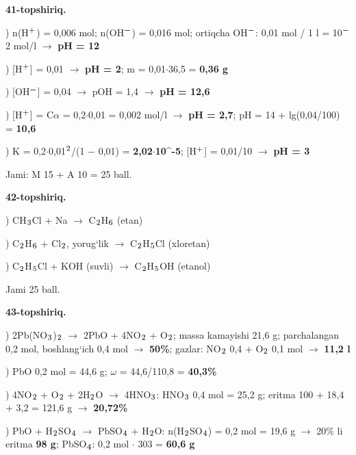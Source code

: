 \documentclass[11pt,a4paper]{article}
\renewcommand{\textsubscript}[1]{\ensuremath{_{\text{\fontsize{8}{8}\selectfont #1}}}}
\renewcommand{\textsuperscript}[1]{\ensuremath{^{\text{\fontsize{8}{8}\selectfont #1}}}}
\begin{document}
\noindent\textbf{41-topshiriq.}\par
{}) n(H\textsuperscript{+}) = 0,006 mol; n(OH\textsuperscript{$-$}) = 0,016 mol; ortiqcha OH\textsuperscript{$-$}: 0,01 mol / 1 l = 10\textsuperscript{$-$}2 mol/l $\to$ \textbf{pH = 12}\par
{}) [H\textsuperscript{+}] = 0,01 $\to$ \textbf{pH = 2}; m = 0,01$\cdot$36,5 = \textbf{0,36 g}\par
{}) [OH\textsuperscript{$-$}] = 0,04 $\to$ pOH = 1,4 $\to$ \textbf{pH = 12,6}\par
{}) [H\textsuperscript{+}] = C$\alpha$ = 0,2$\cdot$0,01 = 0,002 mol/l $\to$ \textbf{pH = 2,7}; pH = 14 + lg(0,04/100) = \textbf{10,6}\par
{}) K = 0,2$\cdot$0,01\textsuperscript{2}/(1 $-$ 0,01) = \textbf{2,02$\cdot$10\textasciicircum{}-5}; [H\textsuperscript{+}] = 0,01/10 $\to$ \textbf{pH = 3}\par
\noindent Jami: M 15 + A 10 = 25 ball.\par
\noindent\textbf{42-topshiriq.}\par
{}) CH\textsubscript{3}Cl + Na $\to$ C\textsubscript{2}H\textsubscript{6} (etan)\par
{}) C\textsubscript{2}H\textsubscript{6} + Cl\textsubscript{2}, yorug`lik $\to$ C\textsubscript{2}H\textsubscript{5}Cl (xloretan)\par
{}) C\textsubscript{2}H\textsubscript{5}Cl + KOH (suvli) $\to$ C\textsubscript{2}H\textsubscript{5}OH (etanol)\par
\noindent Jami 25 ball.\par
\noindent\textbf{43-topshiriq.}\par
{}) 2Pb(NO\textsubscript{3})\textsubscript{2} $\to$ 2PbO + 4NO\textsubscript{2} + O\textsubscript{2}; massa kamayishi 21,6 g; parchalangan 0,2 mol, boshlang`ich 0,4 mol $\to$ \textbf{50\%}; gazlar: NO\textsubscript{2} 0,4 + O\textsubscript{2} 0,1 mol $\to$ \textbf{11,2 l}\par
{}) PbO 0,2 mol = 44,6 g; $\omega$ = 44,6/110,8 = \textbf{40,3\%}\par
{}) 4NO\textsubscript{2} + O\textsubscript{2} + 2H\textsubscript{2}O $\to$ 4HNO\textsubscript{3}: HNO\textsubscript{3} 0,4 mol = 25,2 g; eritma 100 + 18,4 + 3,2 = 121,6 g $\to$ \textbf{20,72\%}\par
{}) PbO + H\textsubscript{2}SO\textsubscript{4} $\to$ PbSO\textsubscript{4} + H\textsubscript{2}O: n(H\textsubscript{2}SO\textsubscript{4}) = 0,2 mol = 19,6 g $\to$ 20\% li eritma \textbf{98 g}; PbSO\textsubscript{4}: 0,2 mol $\cdot$ 303 = \textbf{60,6 g}\par
\end{document}
